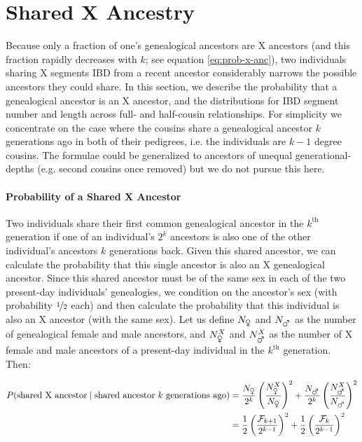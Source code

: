 \documentclass[11pt]{article}
\begin{document}
\section{Shared X Ancestry}
\label{sec:shared-x-anc}

Because only a fraction of one's genealogical ancestors are X ancestors (and
this fraction rapidly decreases with $k$; see equation \eqref{eq:prob-x-anc}),
two individuals sharing X segments IBD from a recent ancestor considerably
narrows the possible ancestors they could share. In this section, we describe
the probability that a genealogical ancestor is an X ancestor, and the
distributions for IBD segment number and length across full- and half-cousin
relationships. For simplicity we concentrate on the case where the cousins
share a genealogical ancestor $k$ generations ago in both of their pedigrees,
i.e. the individuals are $k-1$ degree cousins. The formulae could be
generalized to ancestors of unequal generational-depths (e.g. second cousins
once removed) but we do not pursue this here.

\paragraph{Probability of a Shared X Ancestor} 

Two individuals share their first common genealogical ancestor in the
$k^\text{th}$ generation if one of an individual's $2^k$ ancestors is also one
of the other individual's ancestors $k$ generations back. Given this shared
ancestor, we can calculate the probability that this single ancestor is also an
X genealogical ancestor. Since this shared ancestor must be of the same sex in
each of the two present-day individuals' genealogies, we condition on the
ancestor's sex (with probability $\nicefrac{1}{2}$ each) and then calculate the
probability that this individual is also an X ancestor (with the same sex). Let
us define $N_{\venus}$ and $N_{\mars}$ as the number of genealogical female and
male ancestors, and $N_{\venus}^X$ and $N_{\mars}^X$ as the number of X female
and male ancestors of a present-day individual in the $k^\text{th}$ generation.
Then:

\begin{align}
  \label{eq:prob-shared-x-ancestor}
  P(\text{shared X ancestor} \; | \; \text{shared ancestor } k \text{ generations ago}) &= \frac{N_{\venus}}{2^k}\left(\frac{N_{\venus}^X}{N_{\venus}}\right)^2 + 
  \frac{N_{\mars}}{2^k}\left(\frac{N_{\mars}^X}{N_{\mars}}\right)^2 \nonumber \\
  &= \frac{1}{2}\left(\frac{\mathcal{F}_{k+1}}{2^{k-1}}\right)^2 + \frac{1}{2}\left(\frac{\mathcal{F}_k}{2^{k-1}}\right)^2
\end{align}
\end{document}
